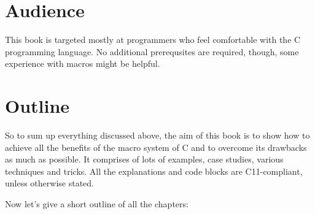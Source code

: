 \documentclass[a4paper, 12pt]{book}
\begin{document}
\newpage

\section{Audience}

This book is targeted mostly at programmers who feel comfortable with the C programming
language. No additional prerequsites are required, though, some experience with macros might
be helpful.

\newpage

\section{Outline}

So to sum up everything discussed above, the aim of this book is to show how to achieve all
the benefits of the macro system of C and to overcome its drawbacks as much as possible. It
comprises of lots of examples, case studies, various techniques and tricks. All the
explanations and code blocks are C11-compliant, unless otherwise stated.

Now let's give a short outline of all the chapters:

\newpage
\end{document}
